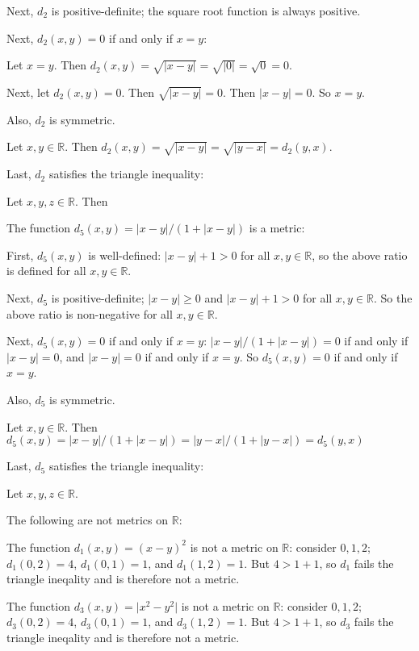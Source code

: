 \documentclass[a4paper,12pt]{article}
\newcommand{\tab}{\hspace{4mm}} %
\newcommand{\absval}[1]{\lvert #1 \rvert}
\newcommand{\R}{\mathbb{R}}
\begin{document}
\tab Next, $d_2$ is positive-definite; the square root function is always positive.

\tab Next, $d_2(x,y) = 0$ if and only if $x=y$: 

\tab \tab Let $x=y$. Then $d_2(x,y) = \sqrt{\absval{x-y}}=\sqrt{\absval{0}}=\sqrt{0}=0$.

\tab \tab Next, let $d_2(x,y) = 0$. Then $\sqrt{\absval{x-y}}=0$. Then $\absval{x-y}=0$. So $x=y$.

\tab Also, $d_2$ is symmetric.

\tab \tab Let $x,y \in \R$. Then $d_2(x,y) = \sqrt{\absval{x-y}} = \sqrt{\absval{y-x}}=d_2(y,x)$.

\tab Last, $d_2$ satisfies the triangle inequality:

\tab \tab Let $x,y,z \in \R$. Then %

The function $d_5(x,y) = \absval{x-y}/(1+\absval{x-y})$ is a metric:

\tab First, $d_5(x,y)$ is well-defined: $\absval{x-y} +1 > 0$ for all $x,y \in \R$, so the above ratio is defined for all $x,y \in \R$.

\tab Next, $d_5$ is positive-definite; $\absval{x-y} \geq 0$ and $\absval{x-y} +1 > 0$ for all $x,y \in \R$. So the above ratio is non-negative for all $x,y \in \R$.

\tab Next, $d_5(x,y) = 0$ if and only if $x=y$: $\absval{x-y}/(1+\absval{x-y}) = 0$ if and only if $\absval{x-y} = 0$, and $\absval{x-y}=0$ if and only if $x=y$. So $d_5(x,y) = 0$ if and only if $x=y$.

\tab Also, $d_5$ is symmetric.

\tab \tab Let $x,y \in \R$. Then $d_5(x,y)= \absval{x-y}/(1+\absval{x-y}) = \absval{y-x}/(1+\absval{y-x})=d_5(y,x)$

\tab Last, $d_5$ satisfies the triangle inequality:

\tab \tab Let $x,y,z \in \R$. %

The following are not metrics on $\R$:

The function $d_1(x,y) = (x-y)^2$ is not a metric on $\R$: consider $0,1,2$; $d_1(0,2) = 4$, $d_1(0,1) = 1$, and $d_1(1,2) = 1$. But $4 > 1+1$, so $d_1$ fails the triangle ineqality and is therefore not a metric.

The function $d_3(x,y) = \absval{x^2-y^2}$ is not a metric on $\R$: consider $0,1,2$; $d_3(0,2) = 4$, $d_3(0,1) = 1$, and $d_3(1,2) = 1$. But $4 > 1+1$, so $d_3$ fails the triangle ineqality and is therefore not a metric. 
\end{document}
